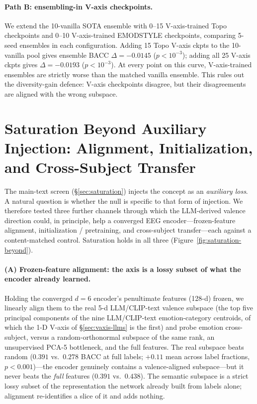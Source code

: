 \paragraph{Path B: ensembling-in V-axis checkpoints.}
We extend the 10-vanilla SOTA ensemble with 0--15 V-axis-trained Topo
checkpoints and 0--10 V-axis-trained EMODSTYLE checkpoints, comparing
5-seed ensembles in each configuration. Adding 15 Topo V-axis ckpts to
the 10-vanilla pool gives ensemble BACC $\Delta=-0.0145$ ($p<10^{-3}$);
adding all 25 V-axis ckpts gives $\Delta=-0.0193$ ($p<10^{-3}$). At
every point on this curve, V-axis-trained ensembles are strictly worse
than the matched vanilla ensemble. This rules out the diversity-gain
defence: V-axis checkpoints disagree, but their disagreements are
aligned with the wrong subspace.


\section{Saturation Beyond Auxiliary Injection: Alignment, Initialization, and Cross-Subject Transfer}
\label{app:saturation-beyond}

The main-text screen (\S\ref{sec:saturation}) injects the concept as an
\emph{auxiliary loss}. A natural question is whether the null is specific
to that form of injection. We therefore tested three further channels
through which the LLM-derived valence direction could, in principle, help
a converged EEG encoder---frozen-feature alignment, initialization /
pretraining, and cross-subject transfer---each against a content-matched
control. Saturation holds in all three
(Figure~\ref{fig:saturation-beyond}).

\paragraph{(A) Frozen-feature alignment: the axis is a lossy subset of
what the encoder already learned.} Holding the converged $d{=}6$
encoder's penultimate features (128-d) frozen, we linearly align them to
the real 5-d LLM/CLIP-text valence subspace (the top five principal
components of the nine LLM/CLIP-text emotion-category centroids, of which
the 1-D V-axis of \S\ref{sec:vaxis-llms} is the first) and probe emotion
cross-subject, versus a random-orthonormal subspace of the same rank, an
unsupervised PCA-5 bottleneck, and the full features. The real subspace
beats random ($0.391$ vs.\ $0.278$ BACC at full labels; $+0.11$ mean
across label fractions, $p{<}0.001$)---the encoder genuinely contains a
valence-aligned subspace---but it never beats the \emph{full} features
($0.391$ vs.\ $0.438$). The semantic subspace is a strict lossy subset of
the representation the network already built from labels alone; alignment
re-identifies a slice of it and adds nothing.


